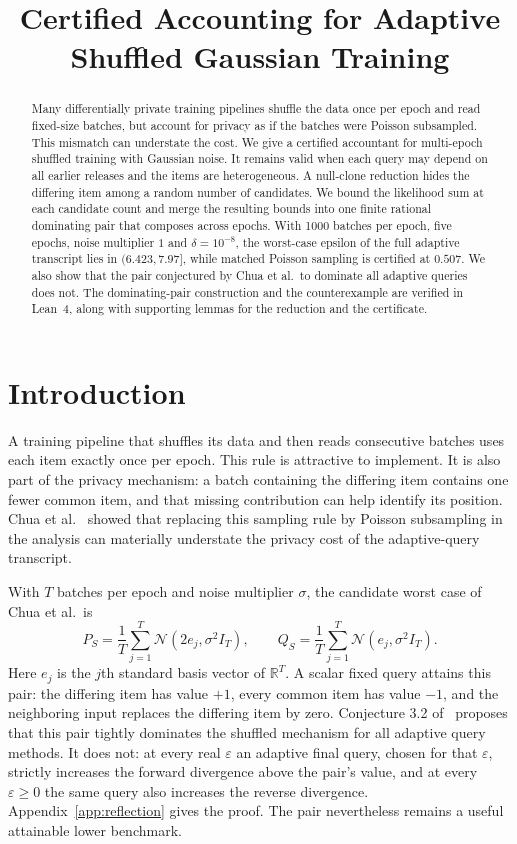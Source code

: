 \documentclass[conference]{IEEEtran}
\title{Certified Accounting for Adaptive\\Shuffled Gaussian Training}
\author{\IEEEauthorblockN{Samuel Mausberg}\IEEEauthorblockA{Independent Researcher}}
\newcommand{\R}{\mathbb R}
\newcommand{\N}{\mathcal N}
\newcommand{\eps}{\varepsilon}
\begin{document}
\pagestyle{plain}
\maketitle
\thispagestyle{plain}
\begin{abstract}
Many differentially private training pipelines shuffle the data once per epoch and read fixed-size batches, but account for privacy as if the batches were Poisson subsampled. This mismatch can understate the cost. We give a certified accountant for multi-epoch shuffled training with Gaussian noise. It remains valid when each query may depend on all earlier releases and the items are heterogeneous. A null-clone reduction hides the differing item among a random number of candidates. We bound the likelihood sum at each candidate count and merge the resulting bounds into one finite rational dominating pair that composes across epochs. With 1000 batches per epoch, five epochs, noise multiplier $1$ and $\delta=10^{-8}$, the worst-case epsilon of the full adaptive transcript lies in $(6.423,7.97]$, while matched Poisson sampling is certified at $0.507$. We also show that the pair conjectured by Chua et al.\ to dominate all adaptive queries does not. The dominating-pair construction and the counterexample are verified in Lean~4, along with supporting lemmas for the reduction and the certificate.
\end{abstract}

\section{Introduction}
A training pipeline that shuffles its data and then reads consecutive batches uses each item exactly once per epoch. This rule is attractive to implement. It is also part of the privacy mechanism: a batch containing the differing item contains one fewer common item, and that missing contribution can help identify its position. Chua et al.~\cite{chua2024,scalable} showed that replacing this sampling rule by Poisson subsampling in the analysis can materially understate the privacy cost of the adaptive-query transcript.

With $T$ batches per epoch and noise multiplier $\sigma$, the candidate worst case of Chua et al.\ is
\begin{equation}\label{eq:chua}
 P_S=\frac1T\sum_{j=1}^T\N(2e_j,\sigma^2 I_T),\qquad
 Q_S=\frac1T\sum_{j=1}^T\N(e_j,\sigma^2 I_T).
\end{equation}
Here $e_j$ is the $j$th standard basis vector of $\R^T$. A scalar fixed query attains this pair: the differing item has value $+1$, every common item has value $-1$, and the neighboring input replaces the differing item by zero. Conjecture 3.2 of~\cite{chua2024} proposes that this pair tightly dominates the shuffled mechanism for all adaptive query methods. It does not: at every real $\eps$ an adaptive final query, chosen for that $\eps$, strictly increases the forward divergence above the pair's value, and at every $\eps\ge0$ the same query also increases the reverse divergence. Appendix~\ref{app:reflection} gives the proof. The pair nevertheless remains a useful attainable lower benchmark.
\end{document}
